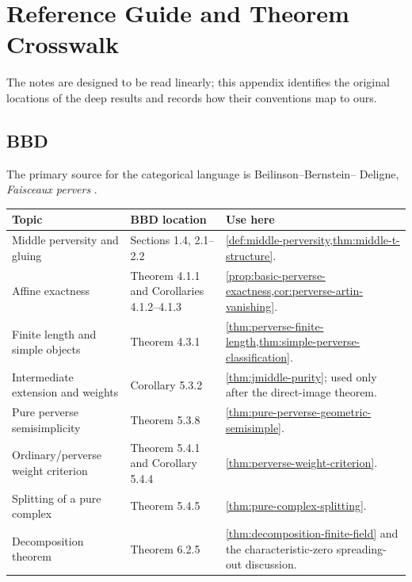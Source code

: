 \chapter{Reference Guide and Theorem Crosswalk}
\label{app:perverse-references}

The notes are designed to be read linearly; this appendix identifies the
original locations of the deep results and records how their conventions map
to ours.

\section{BBD}

The primary source for the categorical language is Beilinson--Bernstein--
Deligne, \emph{Faisceaux pervers} \cite{BBD}.

\begin{longtable}{
 >{\raggedright\arraybackslash}p{}
 >{\raggedright\arraybackslash}p{}
 >{\raggedright\arraybackslash}p{}}
\toprule
Topic & BBD location & Use here\\
\midrule
\endhead
Middle perversity and gluing &
Sections 1.4, 2.1--2.2 &
\cref{def:middle-perversity,thm:middle-t-structure}.\\

Affine exactness &
Theorem 4.1.1 and Corollaries 4.1.2--4.1.3 &
\cref{prop:basic-perverse-exactness,cor:perverse-artin-vanishing}.\\

Finite length and simple objects &
Theorem 4.3.1 &
\cref{thm:perverse-finite-length,thm:simple-perverse-classification}.\\

Intermediate extension and weights &
Corollary 5.3.2 &
\cref{thm:jmiddle-purity}; used only after the direct-image theorem.\\

Pure perverse semisimplicity &
Theorem 5.3.8 &
\cref{thm:pure-perverse-geometric-semisimple}.\\

Ordinary/perverse weight criterion &
Theorem 5.4.1 and Corollary 5.4.4 &
\cref{thm:perverse-weight-criterion}.\\

Splitting of a pure complex &
Theorem 5.4.5 &
\cref{thm:pure-complex-splitting}.\\

Decomposition theorem &
Theorem 6.2.5 &
\cref{thm:decomposition-finite-field} and the characteristic-zero
spreading-out discussion.\\
\bottomrule
\end{longtable}

